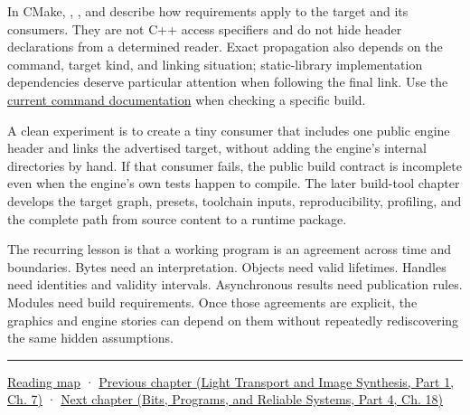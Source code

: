 In CMake, , , and  describe how requirements apply to the target and its consumers. They are not C++ access specifiers and do not hide header declarations from a determined reader. Exact propagation also depends on the command, target kind, and linking situation; static-library implementation dependencies deserve particular attention when following the final link. Use the \href{https://cmake.org/cmake/help/latest/command/target_link_libraries.html}{current command documentation} when checking a specific build.

A clean experiment is to create a tiny consumer that includes one public engine header and links the advertised target, without adding the engine's internal directories by hand. If that consumer fails, the public build contract is incomplete even when the engine's own tests happen to compile. The later build-tool chapter develops the target graph, presets, toolchain inputs, reproducibility, profiling, and the complete path from source content to a runtime package.

The recurring lesson is that a working program is an agreement across time and boundaries. Bytes need an interpretation. Objects need valid lifetimes. Handles need identities and validity intervals. Asynchronous results need publication rules. Modules need build requirements. Once those agreements are explicit, the graphics and engine stories can depend on them without repeatedly rediscovering the same hidden assumptions.

\begin{center}\rule{0.5\linewidth}{0.5pt}\end{center}

\hyperref[volume-reading-map]{Reading map} · \href{../04-Light-Transport-and-Image-Synthesis-P01/main.pdf\#03-visual-computing-i-ch015-rasterization-foundations-and-renderer-evidence}{Previous chapter (Light Transport and Image Synthesis, Part 1, Ch. 7)} · \href{../01-Bits-Programs-and-Reliable-Systems-P04/main.pdf\#03-visual-computing-i-ch017-build-test-and-reproduce-the-program}{Next chapter (Bits, Programs, and Reliable Systems, Part 4, Ch. 18)}
